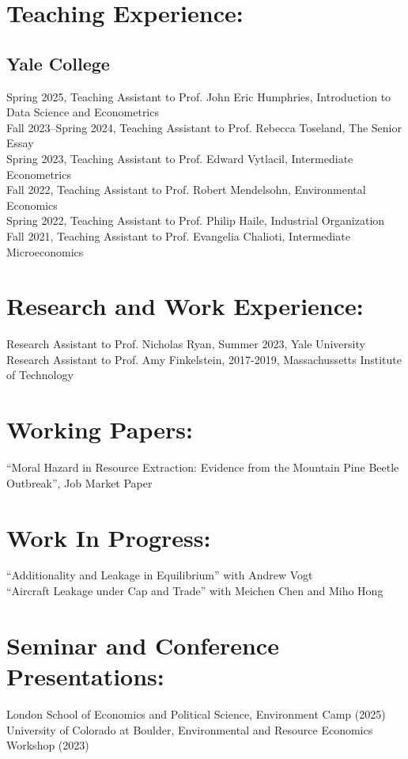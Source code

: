 \documentclass[11pt,letterpaper]{article}
\begin{document}
\newpage

\section*{Teaching Experience:}

\subsection*{Yale College}
Spring 2025, Teaching Assistant to Prof. John Eric Humphries, Introduction to Data Science and Econometrics \\
Fall 2023--Spring 2024, Teaching Assistant to Prof. Rebecca Toseland, The Senior Essay \\
Spring 2023, Teaching Assistant to Prof. Edward Vytlacil, Intermediate Econometrics \\
Fall 2022, Teaching Assistant to Prof. Robert Mendelsohn, Environmental Economics \\
Spring 2022, Teaching Assistant to Prof. Philip Haile, Industrial Organization \\
Fall 2021, Teaching Assistant to Prof. Evangelia Chalioti, Intermediate Microeconomics

\section*{Research and Work Experience:}
Research Assistant to Prof. Nicholas Ryan, Summer 2023, Yale University \\
Research Assistant to Prof. Amy Finkelstein, 2017-2019, Massachussetts Institute of Technology

\section*{Working Papers:}
``Moral Hazard in Resource Extraction: Evidence from the Mountain Pine Beetle Outbreak'', Job Market Paper

\section*{Work In Progress:}
``Additionality and Leakage in Equilibrium'' with Andrew Vogt \\
``Aircraft Leakage under Cap and Trade'' with Meichen Chen and Miho Hong

\section*{Seminar and Conference Presentations:}
London School of Economics and Political Science, Environment Camp (2025)
University of Colorado at Boulder, Environmental and Resource Economics Workshop (2023)
\end{document}
